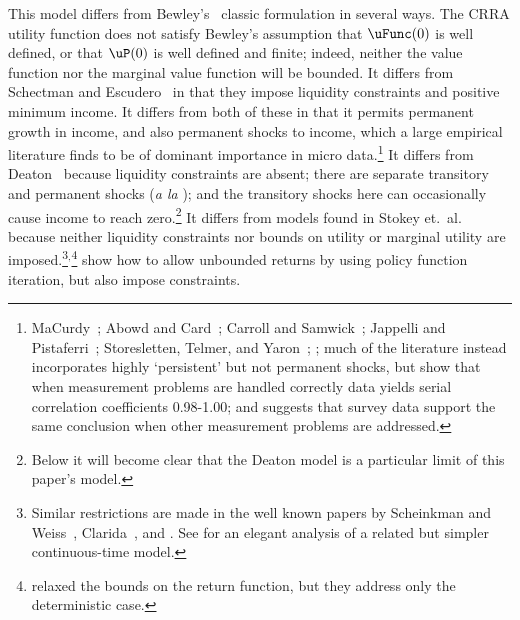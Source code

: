 \documentclass[BufferStockTheory]{subfiles}
\begin{document}
\hypertarget{DiffFromLit}{} This model differs from Bewley's~\citeyearpar{bewleyPIH} classic formulation in several ways. The CRRA utility function does not satisfy Bewley's assumption that $\uFunc(0)$ is well defined, or that $\uP(0)$ is well defined and finite; indeed, neither the value function nor the marginal value function will be bounded.  It differs from Schectman and Escudero~\citeyearpar{seIncFluct} in that they impose liquidity constraints and positive minimum income.  It differs from both of these in that it permits permanent growth in income, and also permanent shocks to income, which a large empirical literature finds to be of dominant importance in micro data.\footnote{MaCurdy~\citeyearpar{macurdyTimeseries}; Abowd and Card~\citeyearpar{acCovariance}; Carroll and Samwick~\citeyearpar{csNature}; Jappelli and Pistaferri~\citeyearpar{jpCins}; Storesletten, Telmer, and Yaron~\citeyearpar{styConsumption}; \cite{blpRisk}; much of the literature instead incorporates highly `persistent' but not permanent shocks, but \cite{dhmImproving} show that when measurement problems are handled correctly data yields serial correlation coefficients 0.98-1.00; and \cite{dmHowMuch} suggests that survey data support the same conclusion when other measurement problems are addressed.}  It differs from Deaton~\citeyearpar{deatonLiqConstr} because liquidity constraints are absent; there are separate transitory and permanent shocks (\textit{a la} \cite{muthOptimal}); and the transitory shocks here can occasionally cause income to reach zero.\footnote{Below it will become clear that the Deaton model is a particular limit of this paper's model.}  It differs from models found in Stokey et.\ al.~\citeyearpar{slpMethods} because neither liquidity constraints nor bounds on utility or marginal utility are imposed.\footnote{Similar restrictions are made in the well known papers by Scheinkman and Weiss~\citeyearpar{scheinkman&weiss:borrowing}, Clarida~\citeyearpar{claridaErgodic}, and \cite{cwcUnderUncert}.  See \cite{tocheUrisk} for an elegant analysis of a related but simpler continuous-time model.}$^{,}$\footnote{\cite{asHomogeneous} relaxed the bounds on the return function, but they address only the deterministic case.} \cite{lsIncFluct} show how to allow unbounded returns by using policy function iteration, but also impose constraints.
\end{document}
